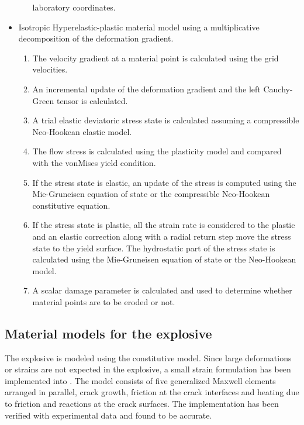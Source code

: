 \begin{itemize}
\begin{enumerate}
              laboratory coordinates.
     \end{enumerate}
   \item Isotropic Hyperelastic-plastic material model using a 
         multiplicative decomposition of the deformation gradient.
     \begin{enumerate}
        \item The velocity gradient at a material point
              is calculated using the grid velocities.
        \item An incremental update of the deformation gradient and
              the left Cauchy-Green tensor is calculated.
        \item A trial elastic deviatoric stress state is calculated
              assuming a compressible Neo-Hookean elastic model.
        \item The flow stress is calculated using the plasticity
              model and compared with the vonMises yield condition.
        \item If the stress state is elastic, an update of the 
              stress is computed using the Mie-Gruneisen equation
              of state or the compressible Neo-Hookean constitutive
              equation.
        \item If the stress state is plastic, all the strain rate 
              is considered to the plastic and an elastic correction
              along with a radial return step move the stress state
              to the yield surface.  The hydrostatic part of the 
              stress state is calculated using the Mie-Gruneisen
              equation of state or the Neo-Hookean model.
        \item A scalar damage parameter is calculated and used
              to determine whether material points are to be eroded
              or not.
     \end{enumerate}
\end{itemize}

\subsection{Material models for the explosive}
The explosive is modeled using the  constitutive 
model.  Since large deformations or strains are not expected in 
the explosive, a small strain formulation has been implemented into 
\Vaango.  The model consists of five generalized Maxwell elements
arranged in parallel, crack growth, friction at the crack 
interfaces and heating due to friction and reactions at the 
crack surfaces.  The implementation has been verified with 
experimental data and found to be accurate.


